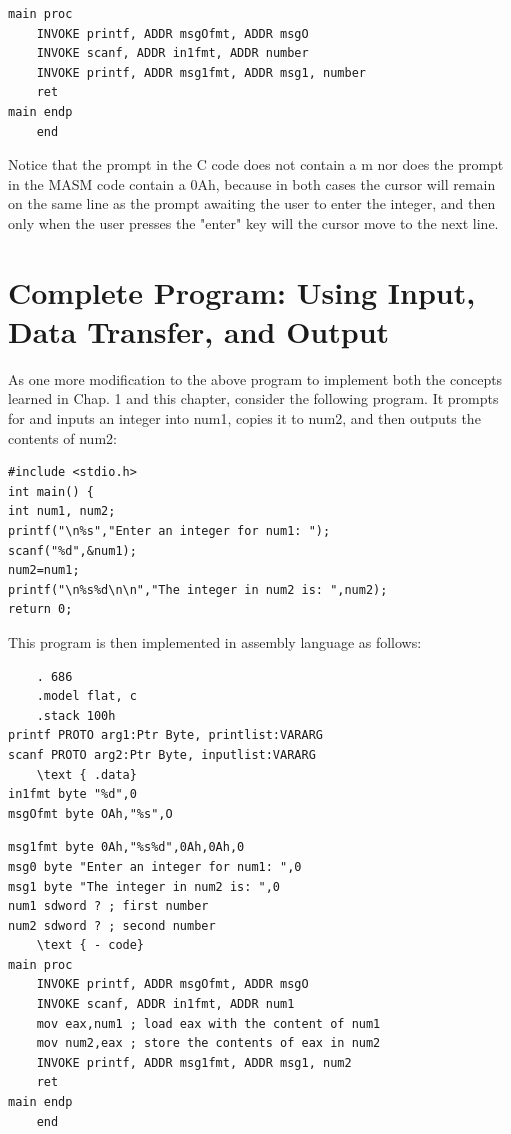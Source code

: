 \documentclass[10pt]{book}
\begin{document}
\begin{verbatim}
main proc
    INVOKE printf, ADDR msgOfmt, ADDR msgO
    INVOKE scanf, ADDR in1fmt, ADDR number
    INVOKE printf, ADDR msg1fmt, ADDR msg1, number
    ret
main endp
    end
\end{verbatim}

Notice that the prompt in the C code does not contain a m nor does the prompt in the MASM code contain a 0Ah, because in both cases the cursor will remain on the same line as the prompt awaiting the user to enter the integer, and then only when the user presses the "enter" key will the cursor move to the next line.

\section{Complete Program: Using Input, Data Transfer, and Output}
As one more modification to the above program to implement both the concepts learned in Chap. 1 and this chapter, consider the following program. It prompts for and inputs an integer into num1, copies it to num2, and then outputs the contents of num2:

\begin{verbatim}
#include <stdio.h>
int main() {
int num1, num2;
printf("\n%s","Enter an integer for num1: ");
scanf("%d",&num1);
num2=num1;
printf("\n%s%d\n\n","The integer in num2 is: ",num2);
return 0;
\end{verbatim}

This program is then implemented in assembly language as follows:

\begin{verbatim}
    . 686
    .model flat, c
    .stack 100h
printf PROTO arg1:Ptr Byte, printlist:VARARG
scanf PROTO arg2:Ptr Byte, inputlist:VARARG
    \text { .data}
in1fmt byte "%d",0
msgOfmt byte OAh,"%s",O
\end{verbatim}

\begin{verbatim}
msg1fmt byte 0Ah,"%s%d",0Ah,0Ah,0
msg0 byte "Enter an integer for num1: ",0
msg1 byte "The integer in num2 is: ",0
num1 sdword ? ; first number
num2 sdword ? ; second number
    \text { - code}
main proc
    INVOKE printf, ADDR msgOfmt, ADDR msgO
    INVOKE scanf, ADDR in1fmt, ADDR num1
    mov eax,num1 ; load eax with the content of num1
    mov num2,eax ; store the contents of eax in num2
    INVOKE printf, ADDR msg1fmt, ADDR msg1, num2
    ret
main endp
    end
\end{verbatim}
\end{document}
